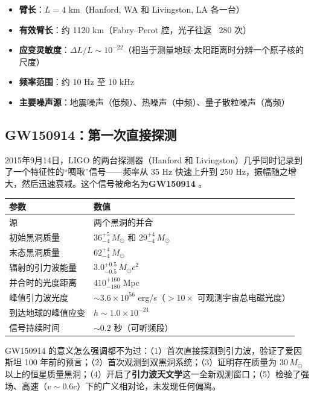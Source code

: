 \begin{property}
\begin{itemize}
    \item \textbf{臂长}：$L = 4$ km（Hanford, WA 和 Livingston, LA 各一台）
    \item \textbf{有效臂长}：约 1120 km（Fabry--Perot 腔，光子往返 ~280 次）
    \item \textbf{应变灵敏度}：$\Delta L/L \sim 10^{-22}$（相当于测量地球-太阳距离时分辨一个原子核的尺度）
    \item \textbf{频率范围}：约 10 Hz 至 10 kHz
    \item \textbf{主要噪声源}：地震噪声（低频）、热噪声（中频）、量子散粒噪声（高频）
\end{itemize}
\end{property}

\subsection{GW150914：第一次直接探测}

2015年9月14日，LIGO 的两台探测器（Hanford 和 Livingston）几乎同时记录到了一个特征性的``啁啾''信号——频率从 35 Hz 快速上升到 250 Hz，振幅随之增大，然后迅速衰减。这个信号被命名为\textbf{GW150914} \cite{Abbott2016}。

\begin{note}[GW150914 的关键参数]
\begin{center}
\begin{tabular}{l|l}
\hline
\textbf{参数} & \textbf{数值} \\ \hline
源 & 两个黑洞的并合 \\
初始黑洞质量 & $36^{+5}_{-4}\,M_\odot$ 和 $29^{+4}_{-4}\,M_\odot$ \\
末态黑洞质量 & $62^{+4}_{-4}\,M_\odot$ \\
辐射的引力波能量 & $3.0^{+0.5}_{-0.5}\,M_\odot c^2$ \\
并合时的光度距离 & $410^{+160}_{-180}$ Mpc \\
峰值引力波光度 & $\sim 3.6 \times 10^{56}$ erg/s（$>10\times$ 可观测宇宙总电磁光度） \\
到达地球的峰值应变 & $h \sim 1.0 \times 10^{-21}$ \\
信号持续时间 & $\sim 0.2$ 秒（可听频段） \\
\hline
\end{tabular}
\end{center}
\end{note}

GW150914 的意义怎么强调都不为过：（1）首次直接探测到引力波，验证了爱因斯坦 100 年前的预言；（2）首次观测到双黑洞系统；（3）证明存在质量为 $30\,M_\odot$ 以上的恒星质量黑洞；（4）开启了\textbf{引力波天文学}这一全新观测窗口；（5）检验了强场、高速（$v \sim 0.6c$）下的广义相对论，未发现任何偏离。


